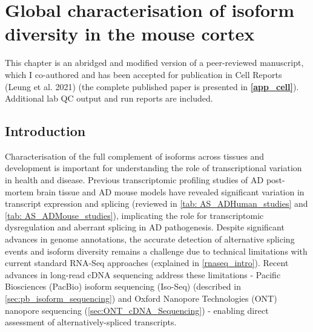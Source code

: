 \chapter{Global characterisation of isoform diversity in the mouse cortex}
\label{ch: whole_transcriptome}


This chapter is an abridged and modified version of a peer-reviewed manuscript, which I co-authored and has been accepted for publication in Cell Reports (Leung et al. 2021)\cite{KayLeung2021} (the complete published paper is presented in \textbf{\cref{app_cell}}). Additional lab QC output and run reports are included. 

\section{Introduction}
Characterisation of the full complement of isoforms across tissues and development is important for understanding the role of transcriptional variation in health and disease. Previous transcriptomic profiling studies of AD post-mortem brain tissue and AD mouse models have revealed significant variation in transcript expression and splicing (reviewed in \cref{tab: AS_ADHuman_studies} and \cref{tab: AS_ADMouse_studies}), implicating the role for transcriptomic dysregulation and aberrant splicing in AD pathogenesis\cite{Raj2018}. Despite significant advances in genome annotations, the accurate detection of alternative splicing events and isoform diversity remains a challenge due to technical limitations with current standard RNA-Seq approaches (explained in \cref{rnaseq_intro}). Recent advances in long-read cDNA sequencing address these limitations - Pacific Biosciences (PacBio) isoform sequencing (Iso-Seq) (described in \cref{sec:pb_isoform_sequencing}) and Oxford Nanopore Technologies (ONT) nanopore sequencing (\cref{sec:ONT_cDNA_Sequencing}) - enabling direct assessment of alternatively-spliced transcripts\cite{Amarasinghe2020}.

